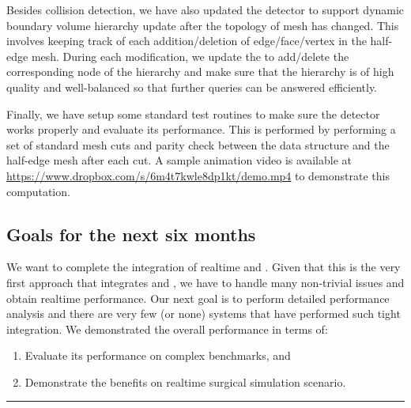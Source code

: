 Besides collision detection, we have also updated the detector to support dynamic boundary volume hierarchy update after the topology of mesh has changed. This involves keeping track of each addition/deletion of edge/face/vertex in the half-edge mesh. During each modification, we update the  to add/delete the corresponding node of the hierarchy and make sure that the hierarchy is of high quality and well-balanced so that further queries can be answered efficiently.

Finally, we have setup some standard test routines to make sure the detector works properly and evaluate its performance. This is performed by performing a set of standard mesh cuts and parity check between the  data structure and the half-edge mesh after each cut. A sample animation video is available at \url{https://www.dropbox.com/s/6m4t7kwle8dp1kt/demo.mp4} to demonstrate this computation.

\subsection{Goals for the next six months}
We want to complete the integration of realtime  and . Given that this is the very first approach that integrates  and , we have to handle many non-trivial issues and obtain realtime performance. Our next goal is to perform detailed performance analysis and there are very few (or none) systems that have performed such tight integration. We demonstrated the overall performance in terms of:

\begin{enumerate}[\em i\em)]
  \item Evaluate its performance on complex benchmarks, and
  \item Demonstrate the benefits on realtime surgical simulation scenario.
\end{enumerate}



\hrule%

\clearpage%
